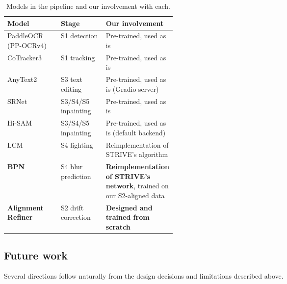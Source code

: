 \begin{table}[H]
  \centering
  \caption{Models in the pipeline and our involvement with each.}
  \label{tab:involvement}
  \begin{tabular}{llp{0.4\linewidth}}
    \toprule
    Model & Stage & Our involvement \\
    \midrule
    PaddleOCR (PP-OCRv4)       & S1 detection
        & Pre-trained, used as is \\
    CoTracker3                 & S1 tracking
        & Pre-trained, used as is \\
    AnyText2                   & S3 text editing
        & Pre-trained, used as is (Gradio server) \\
    SRNet                      & S3/S4/S5 inpainting
        & Pre-trained, used as is \\
    Hi-SAM                     & S3/S4/S5 inpainting
        & Pre-trained, used as is (default backend) \\
    LCM                        & S4 lighting
        & Reimplementation of STRIVE's algorithm \\
    \textbf{BPN}               & S4 blur prediction
        & \textbf{Reimplementation of STRIVE's network}, trained on
          our S2-aligned data \\
    \textbf{Alignment Refiner} & S2 drift correction
        & \textbf{Designed and trained from scratch} \\
    \bottomrule
  \end{tabular}
\end{table}

\subsection{Future work}
\label{sec:conclusion:future}

Several directions follow naturally from the design decisions and
limitations described above.

